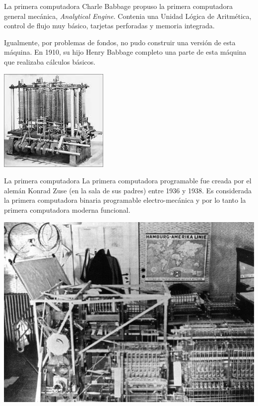 \documentclass[11pt]{beamer}
\begin{document}
\begin{frame}{La primera computadora}
	Charle Babbage propuso la primera computadora general mecánica, \textit{Analytical Engine}. Contenia una Unidad Lógica de Aritmética, control de flujo muy básico, tarjetas perforadas y memoria integrada.
	
	Igualmente, por problemas de fondos, no pudo construir una versión de esta máquina. En 1910, su hijo Henry Babbage completo una parte de esta máquina que realizaba cálculos básicos.
	
	\centering			
	\includegraphics[scale=0.5]{analytical-engine.jpg}
\end{frame}
\begin{frame}{La primera computadora}
	La primera computadora programable fue creada por el alemán Konrad Zuse (en la sala de sus padres) entre 1936 y 1938. Es considerada la primera computadora binaria programable electro-mecánica y por lo tanto la primera computadora moderna funcional.
	
	\centering
	\includegraphics[scale=0.3]{z1.jpg}
\end{frame}
\end{document}
